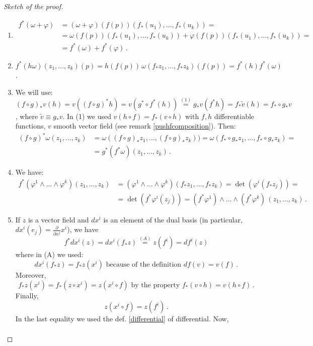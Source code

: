 \documentclass[a4paper,11pt,titlepage, article, oneside]{memoir}
\numberwithin{equation}{section}
\theoremstyle{definition}
\theoremstyle{remark}
\begin{document}
\begin{proof}[Sketch of the proof]
$ $
\begin{enumerate}
\item \begin{align*}
f^*(\omega + \varphi) &= (\omega + \varphi)(f(p)) (f_*(u_1), \ldots, f_*(u_k)) =\\
& = \omega(f(p)) (f_*(u_1), \ldots, f_*(u_k)) + \varphi(f(p)) (f_*(u_1), \ldots, f_*(u_k)) = \\
&=  f^*(\omega) + f^*(\varphi) \, .
\end{align*}
\item $f^*(h \omega) (z_1, \ldots, z_k)(p) = h(f(p))\, \omega (f_* z_1, \ldots, f_* z_k) (f(p)) = f^*(h)f^*(\omega)$.
\item We will use: $(f \circ g)_* v(h) = v \left ( (f \circ g)^* h \right) = v(g^* \circ f^*(h)) \overset{(1)}{=} g_*v(f^*h) = f_* \tilde v (h) = f_* \circ g_* v$, where $\tilde v \equiv g_* v$.  In (1) we used $v(h \circ f) = f_* (v \circ h)$ with $f, h$ differentiable functions, $v$ smooth vector field (see remark \ref{pushfcomposition}). Then:
\begin{align*}
(f \circ g)^* \omega(z_1, \ldots, z_k) &= \omega ((f \circ g)_* z_1, \ldots, (f \circ g)_* z_k)) = \omega(f_* \circ g_* z_1, \ldots, f_* \circ g_* z_k) = \\ &= g^*(f^* \omega)(z_1, \ldots, z_k) \, .
\end{align*}
\item We have: \begin{align*}
f^*(\varphi^1 \wedge \ldots \wedge\varphi^k)(z_1, \ldots, z_k) &= (\varphi^1 \wedge \ldots \wedge \varphi^k)(f_* z_1, \ldots, f_*z_k) = \det\left( \varphi^i (f_* z_j)\right) = \\
&= \det \left( f^* \varphi^i(z_j) \right) = (f^* \varphi^1)\wedge \ldots \wedge (f^* \varphi^k) \, (z_1, \ldots, z_k) \, .
\end{align*}
\item If $z$ is a vector field and $dx^i$ is an element of the dual basis (in particular, $dx^i(e_j) = \frac{\partial}{\partial x^j} x^i$), we have
$$f^*dx^i(z) = dx^i(f_* z) \overset{(A)}{=} z(f^i) = df^i(z)$$
where in (A) we used: 
\[ dx^i(f_* z) = f_* z(x^i) \text{ because of the definition } df(v) = v(f)\, . \]
Moreover,
\[ f_* z(x^i) = f_*(z \circ x^i) = z(x^i \circ f) \text{ by the property } f_*(v \circ h) = v(h \circ f) \, .\]
Finally,
\[ z(x^i \circ f) = z(f^i) \, . \]
In the last equality we used the def. \ref{differential} of differential. 
Now,
\begin{align*}

\end{align*}
\end{enumerate}
\end{proof}
\end{document}

